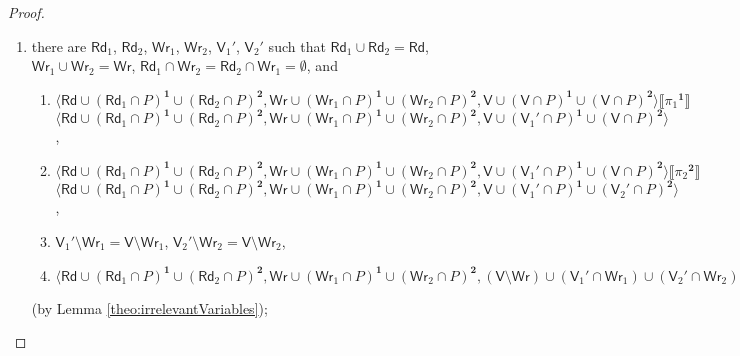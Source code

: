\documentclass{llncs}
\newcommand{\cp}[2]{{#2}^\mathbf{#1}}
\newcommand{\readset}{\mathsf{Rd}}
\newcommand{\valuset}{\mathsf{V}}
\newcommand{\writeset}{\mathsf{Wr}}
\newcommand{\intPgm}[1]{\llbracket #1 \rrbracket}
\renewcommand{\phi}{\varphi}
\newcommand{\tuple}[1]{ \langle #1 \rangle}
\begin{document}
\begin{proof}
\begin{enumerate}
\item
there are 
$\readset_1$, $\readset_2$, $\writeset_1$, $\writeset_2$, $\valuset_1'$, $\valuset_2'$ such that 
$\readset_1 \cup \readset_2 = \readset$, $\writeset_1 \cup \writeset_2 = \writeset$, 
$\readset_1 \cap \writeset_2 = \readset_2 \cap \writeset_1 = \emptyset$, and
{\footnotesize
 \begin{enumerate}
 \item
$\tuple{
\readset  {\cup} \cp 1 {(\readset_1{\cap} P)} {\cup} \cp 2 {(\readset_2{\cap} P)} , 
\writeset {\cup} \cp 1 {(\writeset_1{\cap} P)} {\cup} \cp 2 {(\writeset_2{\cap} P)} , 
\valuset  {\cup} \cp 1 {(\valuset{\cap} P)} {\cup} \cp 2 {(\valuset{\cap} P)}
} 
\intPgm{\cp 1 {\pi_1}} $\\$
\tuple{
\readset  {\cup} \cp 1 {(\readset_1{\cap} P)} {\cup} \cp 2 {(\readset_2{\cap} P)} , 
\writeset {\cup} \cp 1 {(\writeset_1{\cap} P)} {\cup} \cp 2 {(\writeset_2{\cap} P)} , 
\valuset  {\cup} \cp 1 {(\valuset_1'{\cap} P)} {\cup} \cp 2 {(\valuset{\cap} P)}
}$,
 \item
$\tuple{
\readset  {\cup} \cp 1 {(\readset_1{\cap} P)} {\cup} \cp 2 {(\readset_2{\cap} P)} , 
\writeset {\cup} \cp 1 {(\writeset_1{\cap} P)} {\cup} \cp 2 {(\writeset_2{\cap} P)} , 
\valuset  {\cup} \cp 1 {(\valuset_1'{\cap} P)} {\cup} \cp 2 {(\valuset{\cap} P)}
} 
\intPgm{\cp 2 {\pi_2}} $\\$
\tuple{
\readset  {\cup} \cp 1 {(\readset_1{\cap} P)} {\cup} \cp 2 {(\readset_2{\cap} P)} , 
\writeset {\cup} \cp 1 {(\writeset_1{\cap} P)} {\cup} \cp 2 {(\writeset_2{\cap} P)} , 
\valuset  {\cup} \cp 1 {(\valuset_1'{\cap} P)} {\cup} \cp 2 {(\valuset_2'{\cap} P)}
}$,
 \item
$\valuset_1' \setminus \writeset_1 = \valuset \setminus \writeset_1 $,
$\valuset_2' \setminus \writeset_2 = \valuset \setminus \writeset_2 $,
 \item
$\tuple{
\readset  {\cup} \cp 1 {(\readset_1{\cap} P)} {\cup} \cp 2 {(\readset_2{\cap} P)} , 
\writeset {\cup} \cp 1 {(\writeset_1{\cap} P)} {\cup} \cp 2 {(\writeset_2{\cap} P)} , 
(\valuset {\setminus} \writeset) \cup (\valuset_1' {\cap} \writeset_1) \cup (\valuset_2' {\cap} \writeset_2) } \models \phi$ 
 \end{enumerate}
}%
(by Lemma \ref{theo:irrelevantVariables});


\end{enumerate}
\end{proof}
\end{document}
